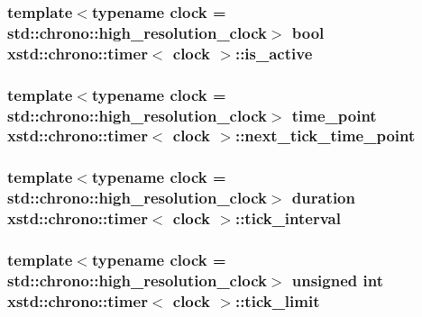 \hypertarget{classxstd_1_1chrono_1_1timer_ac6a3c41d433b7e1387c297b925fb26d7}{
\subsubsection[{is\-\_\-active}]{\setlength{\rightskip}{0pt plus 5cm}template$<$typename clock  = std\-::chrono\-::high\-\_\-resolution\-\_\-clock$>$ bool {\bf xstd\-::chrono\-::timer}$<$ clock $>$\-::is\-\_\-active\hspace{0.3cm}{\ttfamily [protected]}}}\label{classxstd_1_1chrono_1_1timer_ac6a3c41d433b7e1387c297b925fb26d7}
\hypertarget{classxstd_1_1chrono_1_1timer_a51e85ae6c2a43cef074e5ff3e03620f9}{
\subsubsection[{next\-\_\-tick\-\_\-time\-\_\-point}]{\setlength{\rightskip}{0pt plus 5cm}template$<$typename clock  = std\-::chrono\-::high\-\_\-resolution\-\_\-clock$>$ time\-\_\-point {\bf xstd\-::chrono\-::timer}$<$ clock $>$\-::next\-\_\-tick\-\_\-time\-\_\-point\hspace{0.3cm}{\ttfamily [protected]}}}\label{classxstd_1_1chrono_1_1timer_a51e85ae6c2a43cef074e5ff3e03620f9}
\hypertarget{classxstd_1_1chrono_1_1timer_a57838b4d220986131fcd8f5ddc1363bc}{
\subsubsection[{tick\-\_\-interval}]{\setlength{\rightskip}{0pt plus 5cm}template$<$typename clock  = std\-::chrono\-::high\-\_\-resolution\-\_\-clock$>$ duration {\bf xstd\-::chrono\-::timer}$<$ clock $>$\-::tick\-\_\-interval}}\label{classxstd_1_1chrono_1_1timer_a57838b4d220986131fcd8f5ddc1363bc}
\hypertarget{classxstd_1_1chrono_1_1timer_a68ac37affa234daf952955ab2c1d674e}{
\subsubsection[{tick\-\_\-limit}]{\setlength{\rightskip}{0pt plus 5cm}template$<$typename clock  = std\-::chrono\-::high\-\_\-resolution\-\_\-clock$>$ unsigned int {\bf xstd\-::chrono\-::timer}$<$ clock $>$\-::tick\-\_\-limit}}\label{classxstd_1_1chrono_1_1timer_a68ac37affa234daf952955ab2c1d674e}
